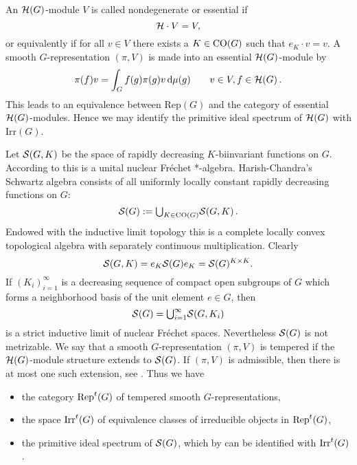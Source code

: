 An $\mathcal H (G)$-module $V$ is called nondegenerate or essential if
\begin{equation}\label{eq:2.1}
\mathcal H \cdot V = V ,
\end{equation}
or equivalently if for all $v \in V$ there exists a $K \in \mathrm{CO}(G)$
such that $e_K \cdot v = v$. A smooth $G$-representation $(\pi ,V)$ is
made into an essential $\mathcal H (G)$-module by
\begin{equation}\label{eq:2.12}
\pi (f) v = \int_G f (g) \pi (g) v \, \textup{d}\mu (g) \qquad v \in V , f \in \mathcal H (G) \,.
\end{equation}
This leads to an equivalence between Rep$(G)$ and the category of
essential $\mathcal H (G)$-modules. Hence we may identify the 
primitive ideal spectrum of $\mathcal H (G)$ with Irr$ (G)$.

Let $\mathcal S (G,K)$ be the space of rapidly decreasing
$K$-biinvariant functions on $G$. According to \cite[Theorem
29]{Vig} this is a unital nuclear Fr\'echet *-algebra.
Harish-Chandra's Schwartz algebra consists of all uniformly
locally constant rapidly decreasing functions on $G$:
\begin{equation}
\mathcal S (G) := {\textstyle \bigcup_{K \in \mathrm{CO}(G)} } \mathcal S (G,K) \,.
\end{equation}
Endowed with the inductive limit topology this is a complete locally convex 
topological algebra with separately continuous multiplication. Clearly
\begin{equation}
\mathcal S (G,K) = e_K \mathcal S (G) e_K = \mathcal S (G)^{K \times K} .
\end{equation}
If $(K_i )_{i=1}^\infty $ is a decreasing sequence of compact open
subgroups of $G$ which forms a neighborhood basis of the unit
element $e \in G$, then
\begin{equation}\label{eq:2.2}
\mathcal S (G) = {\textstyle \bigcup_{i=1}^\infty } \mathcal S (G,K_i )
\end{equation}
is a strict inductive limit of nuclear Fr\'echet spaces. Nevertheless
$\mathcal S (G)$ is not metrizable. We say that a smooth
$G$-representation $(\pi, V)$ is tempered if the $\mathcal H (G)$-module structure
extends to $\mathcal S (G)$. If $(\pi,V)$ is admissible, then there is at most one
such extension, see \cite[p. 51]{SSZ}. Thus we have
\begin{itemize}
\item the category $\mathrm{Rep}^t (G)$ of tempered smooth
$G$-representations,
\item the space $\mathrm{Irr}^t (G)$ of equivalence classes of
irreducible objects in $\mathrm{Rep}^t (G) $,
\item the primitive ideal spectrum of $\mathcal S (G)$, which by
\cite[p. 52]{SSZ} can be identified with $\mathrm{Irr}^t (G)$.
\end{itemize}

